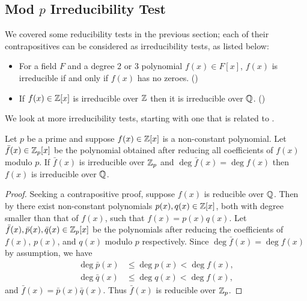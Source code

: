 \subsection{Mod $p$ Irreducibility Test}
We covered some reducibility tests in the previous section; each of their contrapositives can be considered as irreducibility tests, as listed below:
\begin{itemize}
    \item For a field $F$ and a degree 2 or 3 polynomial $f(x) \in F[x]$, $f(x)$ is irreducible if and only if $f(x)$ has no zeroes. ()
    \item If $f(x) \in \mathbb{Z}[x]$ is irreducible over $\mathbb{Z}$ then it is irreducible over $\mathbb{Q}$. ()
\end{itemize}
We look at more irreducibility tests, starting with one that is related to .

\begin{theorem}\label{thrm-mod-p-irreducibility-test}
    Let $p$ be a prime and suppose $f(x) \in \mathbb{Z}[x]$ is a non-constant polynomial. Let $\bar{f}(x) \in \mathbb{Z}_p[x]$ be the polynomial obtained after reducing all coefficients of $f(x)$ modulo $p$. If $\bar{f}(x)$ is irreducible over $\mathbb{Z}_p$ and $\deg \bar{f}(x) = \deg f(x)$ then $f(x)$ is irreducible over $\mathbb{Q}$.
\end{theorem}
\begin{proof}
    Seeking a contrapositive proof, suppose $f(x)$ is reducible over $\mathbb{Q}$. Then by  there exist non-constant polynomials $p(x), q(x) \in \mathbb{Z}[x]$, both with degree smaller than that of $f(x)$, such that $f(x) = p(x)q(x)$. Let $\bar{f}(x), \bar{p}(x), \bar{q}(x) \in \mathbb{Z}_p[x]$ be the polynomials after reducing the coefficients of $f(x)$, $p(x)$, and $q(x)$ modulo $p$ respectively. Since $\deg \bar{f}(x) = \deg f(x)$ by assumption, we have
    \begin{align*}
        \deg \bar{p}(x) &\leq \deg p(x) < \deg f(x),\\
        \deg \bar{q}(x) &\leq \deg q(x) < \deg f(x),
    \end{align*}
    and $\bar{f}(x) = \bar{p}(x)\bar{q}(x)$. Thus $\bar{f}(x)$ is reducible over $\mathbb{Z}_p$.
\end{proof}

